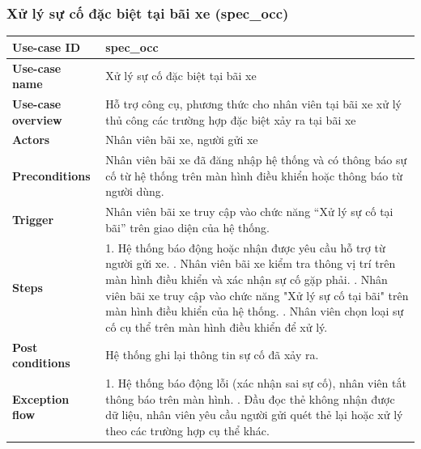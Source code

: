 \subsubsection{Xử lý sự cố đặc biệt tại bãi xe (spec\_occ)}
\begingroup
\small
\begin{longtable}{|>{\centering\arraybackslash}m{3cm}|m{13.7cm}|}
\hline
\textbf{Use-case ID} & spec\_occ \\ \hline
\textbf{Use-case name} & Xử lý sự cố đặc biệt tại bãi xe  \\ \hline
\textbf{Use-case overview} & Hỗ trợ công cụ, phương thức cho nhân viên tại bãi xe xử lý thủ công các trường hợp đặc biệt xảy ra tại bãi xe   \\ \hline
\textbf{Actors} & Nhân viên bãi xe, người gửi xe  \\ \hline
\textbf{Preconditions} & Nhân viên bãi xe đã đăng nhập hệ thống và có thông báo sự cố từ hệ thống trên màn hình điều khiển hoặc thông báo từ người dùng. \\ \hline
\textbf{Trigger} & Nhân viên bãi xe truy cập vào chức năng “Xử lý sự cố tại bãi” trên giao diện của hệ thống. \\ \hline
\textbf{Steps} & 
1. Hệ thống báo động hoặc nhận được yêu cầu hỗ trợ từ người gửi xe. \newline
2. Nhân viên bãi xe kiểm tra thông vị trí trên màn hình điều khiển và xác nhận sự cố gặp phải. \newline
3. Nhân viên bãi xe truy cập vào chức năng "Xử lý sự cố tại bãi" trên màn hình điều khiển của hệ thống. \newline
4. Nhân viên chọn loại sự cố cụ thể trên màn hình điều khiển để xử lý. \\ \hline
\textbf{Post conditions} & Hệ thống ghi lại thông tin sự cố đã xảy ra. \\ \hline
\textbf{Exception flow} & 
1. Hệ thống báo động lỗi (xác nhận sai sự cố), nhân viên tắt thông báo trên màn hình. \newline
2. Đầu đọc thẻ không nhận được dữ liệu, nhân viên yêu cầu người gửi quét thẻ lại hoặc xử lý theo các trường hợp cụ thể khác. \\ \hline
\end{longtable}
\endgroup

